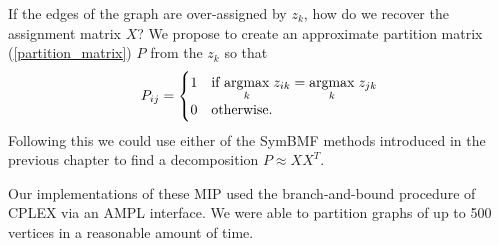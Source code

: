 If the edges of the graph are over-assigned by $z_k$, how do we recover
the assignment matrix $X$? We propose to create an approximate
partition matrix (\ref{partition_matrix}) $P$ from the $z_k$ so that
\[ P_{ij} = \begin{cases}
  1 & \text{if } \underset{k}{\mathrm{arg max}}\; z_{ik} = \underset{k}{\mathrm{arg max}}\; z_{jk} \\
  0 & \text{otherwise}.
\end{cases}\]
Following this we could use either of the SymBMF methods introduced
in the previous chapter to find a decomposition $P \approx X X^T$.

Our implementations of these MIP used the branch-and-bound procedure of
CPLEX via an AMPL interface. We were able to partition graphs of up to
500 vertices in a reasonable amount of time.
